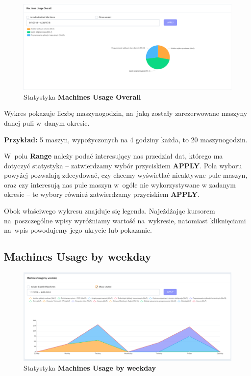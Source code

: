 \documentclass[a5paper, twoside, openany]{book}
\begin{document}
  \begin{figure}[H]
    \centerline{\includegraphics[width=0.9 \textwidth]{statistics_1}}
    \caption{Statystyka \textbf{Machines Usage Overall}}
  \end{figure}

  Wykres pokazuje liczbę maszynogodzin, na~jaką zostały zarezerwowane maszyny danej puli w~danym okresie.
  \begin{framed}
    \textbf{Przykład:} 5 maszyn, wypożyczonych na 4 godziny każda, to 20 maszynogodzin.
  \end{framed}

  W~polu \textbf{Range} należy podać interesujący nas przedział dat, którego ma dotyczyć statystyka -- zatwierdzamy wybór przyciskiem \textbf{APPLY}. Pola wyboru powyżej pozwalają zdecydować, czy chcemy wyświetlać nieaktywne pule maszyn, oraz czy interesują nas pule maszyn w~ogóle nie wykorzystywane w zadanym okresie -- te wybory również zatwierdzamy przyciskiem \textbf{APPLY}.

  Obok właściwego wykresu znajduje się legenda. Najeżdżając kursorem na~poszczególne wpisy wyróżniamy wartość na~wykresie, natomiast kliknięciami na~wpis powodujemy jego ukrycie lub pokazanie.

  \subsection{Machines Usage by weekday}
  \label{MachinesUsageByWeekday}

  \begin{figure}[H]
    \centerline{\includegraphics[width=0.9 \textwidth]{statistics_2}}
    \caption{Statystyka \textbf{Machines Usage by weekday}}
  \end{figure}
\end{document}
